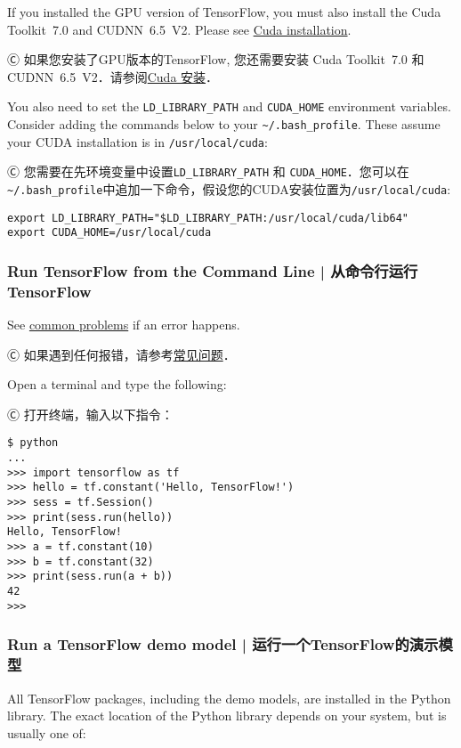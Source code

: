 \textcolor{etc}{If you installed the GPU version of TensorFlow, you must also install the Cuda Toolkit~7.0 and CUDNN~6.5~V2. Please see \hyperref[install_cuda]{Cuda installation}.}

Ⓒ 如果您安装了GPU版本的TensorFlow, 您还需要安装 Cuda Toolkit~7.0 和 CUDNN~6.5~V2．请参阅\hyperref[install_cuda]{Cuda 安装}．

\textcolor{etc}{You also need to set the \lstinline{LD_LIBRARY_PATH} and \lstinline{CUDA_HOME} environment variables. Consider adding the commands below to your} \lstinline{~/.bash_profile}. \textcolor{etc}{These assume your CUDA installation is in \lstinline{/usr/local/cuda}:}

Ⓒ 您需要在先环境变量中设置\lstinline{LD_LIBRARY_PATH} 和 \lstinline{CUDA_HOME}．您可以在\lstinline{~/.bash_profile}中追加一下命令，假设您的CUDA安装位置为\lstinline{/usr/local/cuda}:

\begin{lstlisting}
export LD_LIBRARY_PATH="$LD_LIBRARY_PATH:/usr/local/cuda/lib64"
export CUDA_HOME=/usr/local/cuda
\end{lstlisting}

\subsubsection {Run TensorFlow from the Command Line  |  从命令行运行TensorFlow}

See \hyperref[comm_prob]{common problems} if an error happens.

Ⓒ 如果遇到任何报错，请参考\hyperref[comm_prob]{常见问题}．

Open a terminal and type the following:

Ⓒ 打开终端，输入以下指令：

\begin{lstlisting}
$ python
...
>>> import tensorflow as tf
>>> hello = tf.constant('Hello, TensorFlow!')
>>> sess = tf.Session()
>>> print(sess.run(hello))
Hello, TensorFlow!
>>> a = tf.constant(10)
>>> b = tf.constant(32)
>>> print(sess.run(a + b))
42
>>>
\end{lstlisting}

\subsubsection {Run a TensorFlow demo model  |  运行一个TensorFlow的演示模型}

All TensorFlow packages, including the demo models, are installed in the Python library. The exact location of the Python library depends on your system, but is usually one of:

